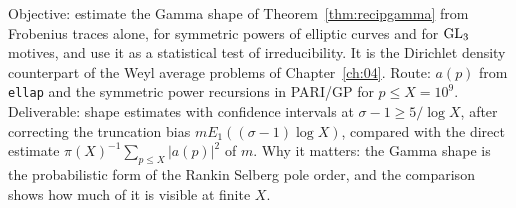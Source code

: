 \begin{compproblem}\label{cp:recipgamma}
Objective: estimate the Gamma shape of Theorem~\ref{thm:recipgamma} from Frobenius traces alone, for symmetric powers of elliptic curves and for $\mathrm{GL}_3$ motives, and use it as a statistical test of irreducibility. It is the Dirichlet density counterpart of the Weyl average problems of Chapter~\ref{ch:04}. Route: $a(p)$ from \texttt{ellap} and the symmetric power recursions in PARI/GP for $p\le X=10^9$. Deliverable: shape estimates with confidence intervals at $\sigma-1\ge5/\log X$, after correcting the truncation bias $mE_1((\sigma-1)\log X)$, compared with the direct estimate $\pi(X)^{-1}\sum_{p\le X}|a(p)|^2$ of $m$. Why it matters: the Gamma shape is the probabilistic form of the Rankin Selberg pole order, and the comparison shows how much of it is visible at finite $X$.
\end{compproblem}
